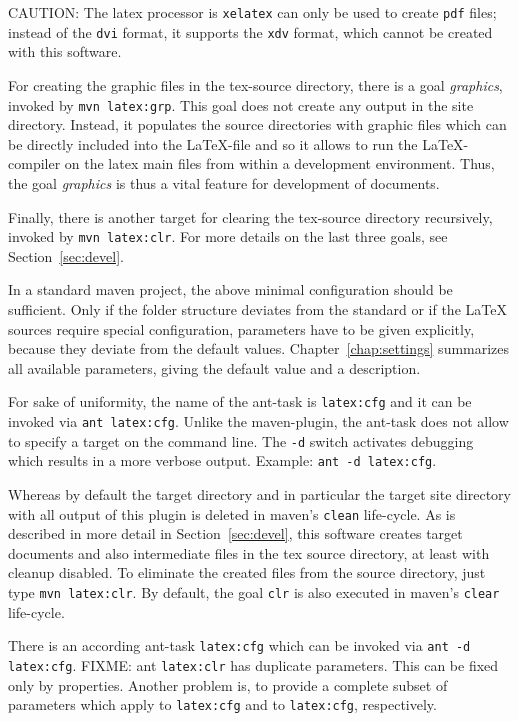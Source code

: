 CAUTION\@: The latex processor is \texttt{xelatex} 
can only be used to create \texttt{pdf} files; 
instead of the \texttt{dvi} format, it supports the \texttt{xdv} format, 
which cannot be created with this software. 

For creating the graphic files in the tex-source directory, 
there is a goal {\em graphics}, invoked by \texttt{mvn latex:grp}. 
This goal does not create any output in the site directory. 
Instead, it populates the source directories 
with graphic files which can be directly included into the \LaTeX-file 
and so it allows to run the \LaTeX-compiler on the latex main files 
from within a development environment. 
Thus, the goal {\em graphics\/} is thus a vital feature 
for development of documents. 


Finally, there is another target for clearing the tex-source directory 
recursively, invoked by \texttt{mvn latex:clr}. 
For more details on the last three goals, see Section~\ref{sec:devel}. 

In a standard maven project, 
the above minimal configuration should be sufficient. 
Only if the folder structure deviates from the standard 
or if the \LaTeX{} sources require special configuration, 
parameters have to be given explicitly, 
because they deviate from the default values. 
Chapter~\ref{chap:settings} summarizes all available parameters, 
giving the default value and a description. 


For sake of uniformity, 
the name of the ant-task is \texttt{latex:cfg} 
and it can be invoked via \texttt{ant latex:cfg}. 
Unlike the maven-plugin, the ant-task 
does not allow to specify a target on the command line. 
The \texttt{-d} switch activates debugging 
which results in a more verbose output. 
Example: \texttt{ant -d latex:cfg}. 

Whereas by default the target directory and in particular 
the target site directory with all output of this plugin is deleted 
in maven's \texttt{clean} life-cycle. 
As is described in more detail in Section~\ref{sec:devel}, 
this software creates target documents and also intermediate files 
in the tex source directory, at least with cleanup disabled. 
To eliminate the created files from the source directory, 
just type \texttt{mvn latex:clr}. 
By default, the goal \texttt{clr} 
is also executed in maven's \texttt{clear} life-cycle. 

There is an according ant-task \texttt{latex:cfg} 
which can be invoked via \texttt{ant -d latex:cfg}. 
FIXME\@: ant  \texttt{latex:clr} has duplicate parameters. 
This can be fixed only by properties. 
Another problem is, to provide a complete subset of parameters 
which apply to \texttt{latex:cfg} and to \texttt{latex:cfg}, respectively. 

